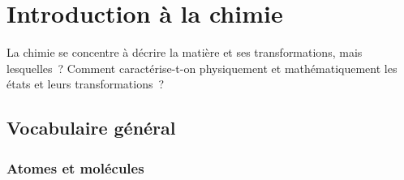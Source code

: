 \documentclass[../main/main.tex]{subfiles}
\begin{document}
\setcounter{chapter}{0}

\chapter{Introduction \`a la chimie}

La chimie se concentre à décrire la matière et ses transformations, mais
lesquelles~? Comment caractérise-t-on physiquement et mathématiquement les états
et leurs transformations~?

\section{Vocabulaire général}
\subsection{Atomes et molécules}
\end{document}
